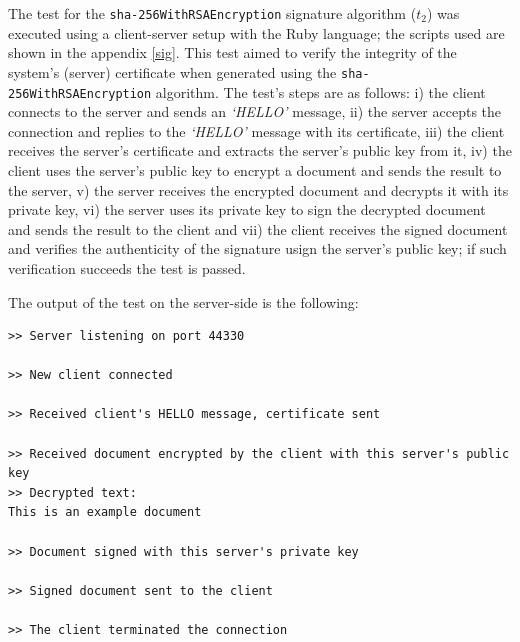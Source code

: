 The test for the \texttt{sha-256WithRSAEncryption} signature algorithm (\(t_2\)) was executed using a client-server setup with the Ruby language; the scripts used are shown in the appendix \ref{sig}. This test aimed to verify the integrity of the system's (server) certificate when generated using the \texttt{sha-256WithRSAEncryption} algorithm. The test's steps are as follows: i) the client connects to the server and sends an \textit{`HELLO'} message, ii) the server accepts the connection and replies to the \textit{`HELLO'} message with its certificate, iii) the client receives the server's certificate and extracts the server's public key from it, iv) the client uses the server's public key to encrypt a document and sends the result to the server, v) the server receives the encrypted document and decrypts it with its private key, vi) the server uses its private key to sign the decrypted document and sends the result to the client and vii) the client receives the signed document and verifies the authenticity of the signature usign the server's public key; if such verification succeeds the test is passed.

The output of the test on the server-side is the following:
\begin{verbatim}
>> Server listening on port 44330

>> New client connected

>> Received client's HELLO message, certificate sent

>> Received document encrypted by the client with this server's public key
>> Decrypted text:
This is an example document

>> Document signed with this server's private key

>> Signed document sent to the client

>> The client terminated the connection
\end{verbatim}

